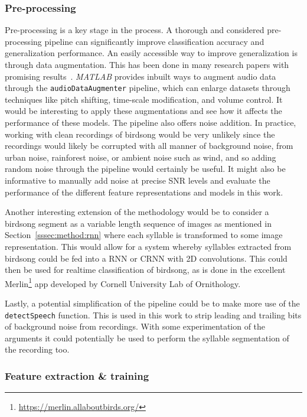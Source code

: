 \subsubsection{Pre-processing}

Pre-processing is a key stage in the process. A thorough and considered
pre-processing pipeline can significantly improve classification accuracy and
generalization performance. An easily accessible way to improve generalization
is through data augmentation. This has been done in many research papers with
promising results~\cite{kahl2017large}. \textit{MATLAB} provides inbuilt ways to
augment audio data through the \texttt{audioDataAugmenter} pipeline, which can
enlarge datasets through techniques like pitch shifting, time-scale
modification, and volume control. It would be interesting to apply these
augmentations and see how it affects the performance of these models. The
pipeline also offers noise addition. In practice, working with clean recordings
of birdsong would be very unlikely since the recordings would likely be
corrupted with all manner of background noise, from urban noise, rainforest
noise, or ambient noise such as wind, and so adding random noise through the
pipeline would certainly be useful. It might also be informative to manually add
noise at precise SNR levels and evaluate the performance of the different
feature representations and models in this work.

Another interesting extension of the methodology would be to consider a birdsong
segment as a variable length sequence of images as mentioned in
Section~\ref{sssec:method:rnn} where each syllable is transformed to some image
representation. This would allow for a system whereby syllables extracted from
birdsong could be fed into a RNN or CRNN with 2D convolutions. This could then
be used for realtime classification of birdsong, as is done in the excellent
Merlin\footnote{\url{https://merlin.allaboutbirds.org/}} app developed by
Cornell University Lab of Ornithology.

Lastly, a potential simplification of the pipeline could be to make more use of
the \texttt{detectSpeech} function. This is used in this work to strip leading
and trailing bits of background noise from recordings. With some experimentation
of the arguments it could potentially be used to perform the syllable
segmentation of the recording too.

\subsubsection{Feature extraction \& training}

